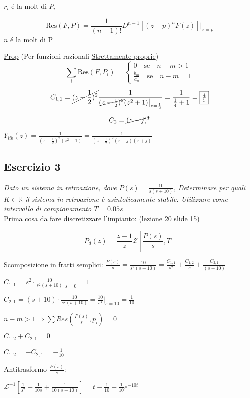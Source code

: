 \documentclass{article}
\begin{document}
$r_i$ \'e la molt di $P_i$

\[ \text{Res}(F, P) = \frac{1}{(n-1)!} D^{n-1}[(z-p)^n F(z)]\big|_{z=p} \]
$n$ \'e la molt di P

\underline{Prop} (Per funzioni razionali \underline{Strettamente proprie})
\[
    \sum_i \text{Res}(F, P_i) = \begin{cases}
        0 \quad \text{se} \quad n-m > 1 \\
        \frac{b_m}{a_n} \quad \text{se} \quad n-m = 1
    \end{cases}
\]

\[ C_{1,1} = \cancel{(z - \frac{1}{2})^2} \frac{1}{\cancel{(z - \frac{1}{2})^2} (z^2 +1) \big|_{z=\frac{1}{2}}} = \frac{1}{\frac{1}{4} + 1} = \framebox{$\frac{4}{5}$} \]

\[ C_2 = \cancel{(z - j)^1} \]


$Y_{lib}(z) = \frac{1}{\left( z-\frac{1}{2} \right)^2(z^2 +1)} = \frac{1}{\left(z-\frac{1}{2}\right)^2(z-j)(z+j)}$

\subsection{Esercizio 3}
\textit{Dato un sistema in retroazione, dove $P(s) = \frac{10}{s(s+10)}$, Determinare per quali $K \in \mathbb{R}$ il sistema in retroazione \`e asintoticamente stabile.
Utilizzare come intervallo di campionamento $T = 0.05 s$}\\

Prima cosa da fare discretizzare l'impianto: (lezione 20 slide 15)

\[ P_d(z) = \frac{z-1}{z} \mathcal{Z}\left[ \frac{P(s)}{s}, T\right] \]


Scomposizione in fratti semplici:
$ \frac{P(s)}{s} = \frac{10}{s^2 (s+10)} = \frac{C_{1,1}}{s^2} + \frac{C_{1,2}}{s} + \frac{C_{2,1}}{(s+10)} $

$ C_{1,1} = s^2 \cdot \frac{10}{s^2(s+10)} \Big|_{s=0} = 1$

$ C_{2,1} = (s + 10) \cdot \frac{10}{s^2(s+10)} = \frac{10}{s^2} \Big|_{s=10} = \frac{1}{10} $

\bigbreak

$n -m  > 1 \Rightarrow \sum Res( \frac{P(s)}{s}, p_i) = 0$

$C_{1,2} + C_{2,1} = 0$

$C_{1,2} = -C_{2,1} = -\frac{1}{10}$

\bigbreak
Antitrasformo $\frac{P(s)}{s}$:

$\mathcal{L}^{-1}\left[ \frac{1}{s^2} - \frac{1}{10 s} + \frac{1}{10(s+10)} \right] = t - \frac{1}{10} + \frac{1}{10}e^{-10t}$
\end{document}

